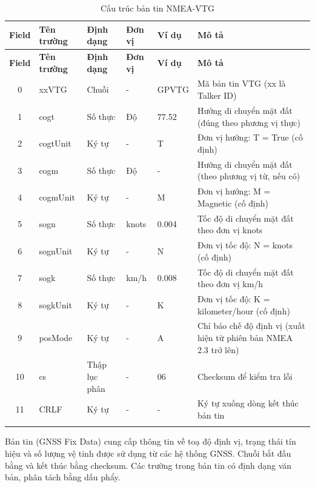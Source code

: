 \documentclass[../DoAn.tex]{subfiles}
\begin{document}
\begin{longtable}{|c|l|l|l|l|p{4cm}|}
\hline
\textbf{Field} & \textbf{Tên trường} & \textbf{Định dạng} & \textbf{Đơn vị} & \textbf{Ví dụ} & \textbf{Mô tả} \\
\hline
\endfirsthead

\hline
\textbf{Field} & \textbf{Tên trường} & \textbf{Định dạng} & \textbf{Đơn vị} & \textbf{Ví dụ} & \textbf{Mô tả} \\
\hline
\endhead

\hline
\endfoot

\endlastfoot

0 & xxVTG & Chuỗi & - & GPVTG & Mã bản tin VTG (xx là Talker ID) \\ \hline
1 & cogt & Số thực & Độ & 77.52 & Hướng di chuyển mặt đất (đúng theo phương vị thực) \\ \hline
2 & cogtUnit & Ký tự & - & T & Đơn vị hướng: T = True (cố định) \\ \hline
3 & cogm & Số thực & Độ & - & Hướng di chuyển mặt đất (theo phương vị từ, nếu có) \\ \hline
4 & cogmUnit & Ký tự & - & M & Đơn vị hướng: M = Magnetic (cố định) \\ \hline
5 & sogn & Số thực & knots & 0.004 & Tốc độ di chuyển mặt đất theo đơn vị knots \\ \hline
6 & sognUnit & Ký tự & - & N & Đơn vị tốc độ: N = knots (cố định) \\ \hline
7 & sogk & Số thực & km/h & 0.008 & Tốc độ di chuyển mặt đất theo đơn vị km/h \\ \hline
8 & sogkUnit & Ký tự & - & K & Đơn vị tốc độ: K = kilometer/hour (cố định) \\ \hline
9 & posMode & Ký tự & - & A & Chỉ báo chế độ định vị (xuất hiện từ phiên bản NMEA 2.3 trở lên) \\ \hline
10 & cs & Thập lục phân & - & 06 & Checksum để kiểm tra lỗi \\ \hline
11 & CRLF & Ký tự & - & - & Ký tự xuống dòng kết thúc bản tin \\ \hline

\caption{Cấu trúc bản tin NMEA-VTG} \\
\end{longtable}

Bản tin  (GNSS Fix Data) cung cấp thông tin về toạ độ định vị, trạng thái tín hiệu và số lượng vệ tinh được sử dụng từ các hệ thống GNSS. Chuỗi bắt đầu bằng  và kết thúc bằng checksum. Các trường trong bản tin có định dạng văn bản, phân tách bằng dấu phẩy.
\end{document}
